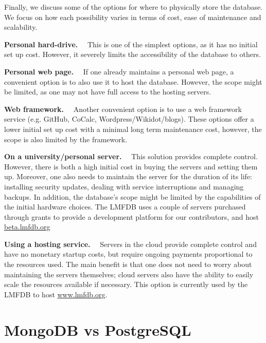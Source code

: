 \documentclass{amsart}
\newcommand{\subhead}[1]{\vspace{0.1in} \noindent \textbf{#1.}\ \ }
\begin{document}
Finally, we discuss some of the options for where to physically store the database.
We focus on how each possibility varies in terms of cost, ease of maintenance and scalability. 

\subhead{Personal hard-drive}
    This is one of the simplest options, as it has no initial set up cost.
    However, it severely limits the accessibility of the database to others.

\subhead{Personal web page}
    If one already maintains a personal web page, a convenient option is to also use it to host the database.
    However, the scope might be limited, as one may not have full access to the hosting servers.

\subhead{Web framework}
    Another convenient option is to use a web framework service (e.g. GitHub, CoCalc, Wordpress/Wikidot/blogs).
    These options offer a lower initial set up cost with a minimal long term maintenance cost, however, the scope is also limited by the framework.

\subhead{On a university/personal server}
    This solution provides complete control.
    However, there is both a high initial cost in buying the servers and setting them up.  Moreover, one also needs to maintain the server for the duration of its life: installing security updates, dealing with service interruptions and managing backups.
    In addition, the database's scope might be limited by the capabilities of the initial hardware choices.
    The LMFDB uses a couple of servers purchased through grants to provide a development platform for our contributors, and host \url{beta.lmfdb.org}

\subhead{Using a hosting service}
Servers in the cloud \cites{aws, gcp} provide complete control and have no monetary startup costs, but require ongoing payments proportional to the resources used.
    The main benefit is that one does not need to worry about maintaining the servers themselves; cloud servers also have the ability to easily scale the resources available if necessary.
    This option is currently used by the LMFDB to host \url{www.lmfdb.org}.


\section{MongoDB vs PostgreSQL}
\label{sec:MvsP}
\end{document}

